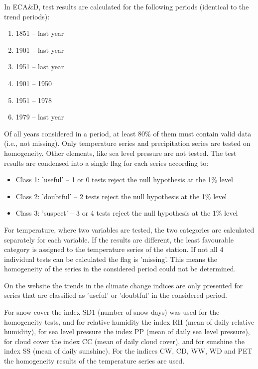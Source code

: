 \documentclass[a4paper,11pt]{article}
\begin{document}
In ECA\&D, test results are calculated for the following periods
(identical to the trend periods):
\begin{enumerate}
\item 1851 -- last year
\item 1901 -- last year 
\item 1951 -- last year
\item 1901 -- 1950 
\item 1951 -- 1978
\item 1979 -- last year
\end{enumerate}
Of all years considered in a period, at least 80\% of them must
contain valid data (i.e., not missing). Only temperature series and
precipitation series are tested on homogeneity. Other elements, like
sea level pressure are not tested. The test results are condensed
into a single flag for each series according to:
\begin{itemize}
\item Class 1: 'useful' -- 1 or 0 tests reject the null hypothesis at
the 1\% level 
\item Class 2: 'doubtful' -- 2 tests reject the null hypothesis at the
1\% level
\item Class 3: 'suspect' -- 3 or 4 tests reject the null hypothesis at
the 1\% level
\end{itemize}

For temperature, where two variables are tested, the two categories
are calculated separately for each variable. If the results are
different, the least favourable category is assigned to the
temperature series of the station. If not all 4 individual tests can
be calculated the flag is 'missing'. This means the homogeneity of the
series in the considered period could not be determined.

On the website the trends in the climate change indices are only
presented for series that are classified as 'useful' or 'doubtful' in
the considered period.

For snow cover the index SD1 (number of snow days) was used for the
homogeneity tests, and for relative humidity the index RH (mean of daily
relative humidity), for sea level pressure the index PP (mean of daily
sea level pressure), for cloud cover the index CC (mean of daily cloud
cover), and for sunshine the index SS (mean of daily sunshine). For
the indices CW, CD, WW, WD and PET the homogeneity results of the
temperature series are used.


\end{document}
